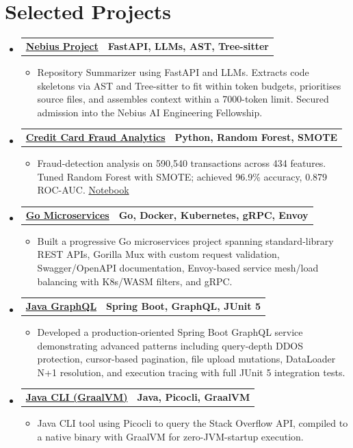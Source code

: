 \documentclass[letterpaper,11pt]{article}
\makeatletter
\newcommand{\resumeItem}[1]{
  \item\small{
    {#1 \vspace{-3pt}}
  }
}
\newcommand{\resumeProjectHeading}[2]{
  \vspace{-3pt}\item
    \begin{tabular*}{1.0\textwidth}[t]{l@{\extracolsep{\fill}}r}
      \textbf{#1} & \textbf{\small #2} \\
    \end{tabular*}\vspace{-7pt}
}
\newcommand{\resumeSubHeadingListStart}{\begin{itemize}[leftmargin=0.0in, label={}]}
\newcommand{\resumeSubHeadingListEnd}{\end{itemize}}
\newcommand{\resumeItemListStart}{\begin{itemize}}
\newcommand{\resumeItemListEnd}{\end{itemize}\vspace{0pt}}
\makeatother
\begin{document}
\section{Selected Projects}
\resumeSubHeadingListStart
    \resumeProjectHeading
        {\href{https://github.com/aymanapatel/nebius-project}{\textbf{Nebius Project}}}{FastAPI, LLMs, AST, Tree-sitter}
        \resumeItemListStart
            \resumeItem{Repository Summarizer using FastAPI and LLMs. Extracts code skeletons via AST and Tree-sitter to fit within token budgets, prioritises source files, and assembles context within a 7000-token limit. Secured admission into the Nebius AI Engineering Fellowship.}
        \resumeItemListEnd
    \resumeProjectHeading
        {\href{https://github.com/aymanapatel/qmul-all-projects/blob/main/data-analytics/coursework1/credit-card-report.pdf}{\textbf{Credit Card Fraud Analytics}}}{Python, Random Forest, SMOTE}
        \resumeItemListStart
            \resumeItem{Fraud-detection analysis on 590,540 transactions across 434 features. Tuned Random Forest with SMOTE; achieved 96.9\% accuracy, 0.879 ROC-AUC. \href{https://github.com/aymanapatel/qmul-all-projects/blob/main/data-analytics/coursework1/credit-card-notebook.ipynb}{Notebook}}
        \resumeItemListEnd
    \resumeProjectHeading
        {\href{https://github.com/aymanapatel/golang-microservices}{\textbf{Go Microservices}}}{Go, Docker, Kubernetes, gRPC, Envoy}
        \resumeItemListStart
            \resumeItem{Built a progressive Go microservices project spanning standard-library REST APIs, Gorilla Mux with custom request validation, Swagger/OpenAPI documentation, Envoy-based service mesh/load balancing with K8s/WASM filters, and gRPC.}
        \resumeItemListEnd
    \resumeProjectHeading
        {\href{https://github.com/aymanapatel/java-graphql}{\textbf{Java GraphQL}}}{Spring Boot, GraphQL, JUnit 5}
        \resumeItemListStart
            \resumeItem{Developed a production-oriented Spring Boot GraphQL service demonstrating advanced patterns including query-depth DDOS protection, cursor-based pagination, file upload mutations, DataLoader N+1 resolution, and execution tracing with full JUnit 5 integration tests.}
        \resumeItemListEnd
    \resumeProjectHeading
        {\href{https://github.com/aymanapatel/java-cli}{\textbf{Java CLI (GraalVM)}}}{Java, Picocli, GraalVM}
        \resumeItemListStart
            \resumeItem{Java CLI tool using Picocli to query the Stack Overflow API, compiled to a native binary with GraalVM for zero-JVM-startup execution.}
        \resumeItemListEnd
\resumeSubHeadingListEnd
\end{document}

